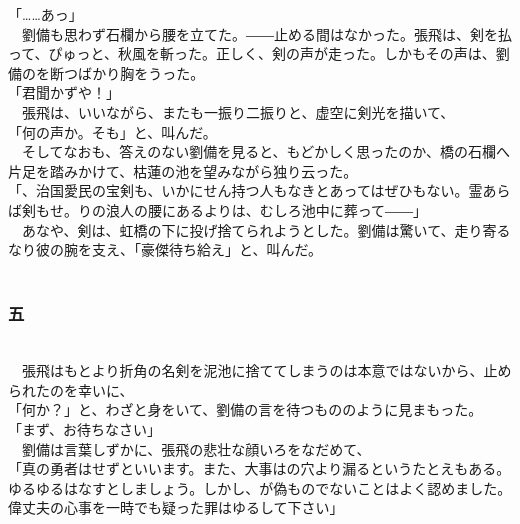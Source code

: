 \documentclass[
  paper=a5,
  fontsize=10pt,
  jafontsize=9.5pt,
  tate,                  %
  open_bracket_pos=nibu, %
]{jlreq}
\begin{document}
「……あっ」\\


　劉備も思わず石欄から腰を立てた。――止める間はなかった。張飛は、剣を払って、ぴゅっと、秋風を斬った。正しく、剣の声が走った。しかもその声は、劉備のを断つばかり胸をうった。\\


「君聞かずや！」\\


　張飛は、いいながら、またも一振り二振りと、虚空に剣光を描いて、\\


「何の声か。そも」と、叫んだ。\\


　そしてなおも、答えのない劉備を見ると、もどかしく思ったのか、橋の石欄へ片足を踏みかけて、枯蓮の池を望みながら独り云った。\\


「、治国愛民の宝剣も、いかにせん持つ人もなきとあってはぜひもない。霊あらば剣もせ。りの浪人の腰にあるよりは、むしろ池中に葬って――」\\


　あなや、剣は、虹橋の下に投げ捨てられようとした。劉備は驚いて、走り寄るなり彼の腕を支え、「豪傑待ち給え」と、叫んだ。\\

\\

\subsubsection{五}

\\


　張飛はもとより折角の名剣を泥池に捨ててしまうのは本意ではないから、止められたのを幸いに、\\


「何か？」と、わざと身をいて、劉備の言を待つもののように見まもった。\\


「まず、お待ちなさい」\\


　劉備は言葉しずかに、張飛の悲壮な顔いろをなだめて、\\


「真の勇者はせずといいます。また、大事はの穴より漏るというたとえもある。ゆるゆるはなすとしましょう。しかし、が偽ものでないことはよく認めました。偉丈夫の心事を一時でも疑った罪はゆるして下さい」\\
\end{document}

